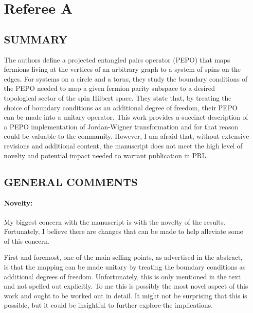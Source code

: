 \documentclass[aps,prx,floatfix,10pt,amssymb,amsfont,amsmath,superscriptaddress,float,nofootinbib,longbibliography,nobalancelastpage]{revtex4-2}
\begin{document}
\section*{Referee A}

\subsection*{SUMMARY}

The authors define a projected entangled pairs operator (PEPO) that maps fermions living at the vertices of an arbitrary graph to a system of spins on the edges. For systems on a circle and
a torus, they study the boundary conditions of the PEPO needed to map a given fermion parity subspace to a desired topological sector of the spin Hilbert space. They state that, by treating
the choice of boundary conditions as an additional degree of freedom, their PEPO can be made into a unitary operator. This work provides a succinct description of a PEPO implementation of
Jordan-Wigner transformation and for that reason could be valuable to the community. However, I am afraid that, without extensive revisions and additional content, the manuscript does not meet
the high level of novelty and potential impact needed to warrant publication in PRL.

\subsection*{GENERAL COMMENTS}

\paragraph*{Novelty:} My biggest concern with the manuscript is with the novelty of the results. Fortunately, I believe there are changes that can be made to help alleviate some of this concern.

First and foremost, one of the main selling points, as advertised in the abstract, is that the mapping can be made unitary by treating the boundary conditions as additional degrees of freedom. Unfortunately, this is only mentioned in the text and not spelled out explicitly. To me this is possibly the most novel aspect of this work and ought to be worked out in detail. It might not be surprising that this is possible, but it could be insightful to further explore the implications.
\end{document}
